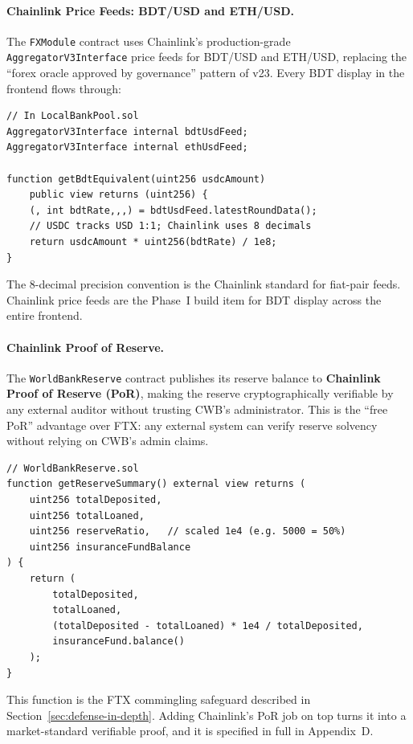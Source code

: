 \documentclass[12pt,a4paper]{report}
\begin{document}
\paragraph{Chainlink Price Feeds: BDT/USD and ETH/USD.}
The \texttt{FXModule} contract uses Chainlink's production-grade \texttt{AggregatorV3Interface} price feeds for BDT/USD and ETH/USD, replacing the ``forex oracle approved by governance'' pattern of v23. Every BDT display in the frontend flows through:

\begin{verbatim}
// In LocalBankPool.sol
AggregatorV3Interface internal bdtUsdFeed;
AggregatorV3Interface internal ethUsdFeed;

function getBdtEquivalent(uint256 usdcAmount)
    public view returns (uint256) {
    (, int bdtRate,,,) = bdtUsdFeed.latestRoundData();
    // USDC tracks USD 1:1; Chainlink uses 8 decimals
    return usdcAmount * uint256(bdtRate) / 1e8;
}
\end{verbatim}

The 8-decimal precision convention is the Chainlink standard for fiat-pair feeds. Chainlink price feeds are the Phase~I build item for BDT display across the entire frontend.

\paragraph{Chainlink Proof of Reserve.}
The \texttt{WorldBankReserve} contract publishes its reserve balance to \textbf{Chainlink Proof of Reserve (PoR)}, making the reserve cryptographically verifiable by any external auditor without trusting CWB's administrator. This is the ``free PoR'' advantage over FTX: any external system can verify reserve solvency without relying on CWB's admin claims.

\begin{verbatim}
// WorldBankReserve.sol
function getReserveSummary() external view returns (
    uint256 totalDeposited,
    uint256 totalLoaned,
    uint256 reserveRatio,   // scaled 1e4 (e.g. 5000 = 50%)
    uint256 insuranceFundBalance
) {
    return (
        totalDeposited,
        totalLoaned,
        (totalDeposited - totalLoaned) * 1e4 / totalDeposited,
        insuranceFund.balance()
    );
}
\end{verbatim}

This function is the FTX commingling safeguard described in Section~\ref{sec:defense-in-depth}. Adding Chainlink's PoR job on top turns it into a market-standard verifiable proof, and it is specified in full in Appendix~D.
\end{document}
